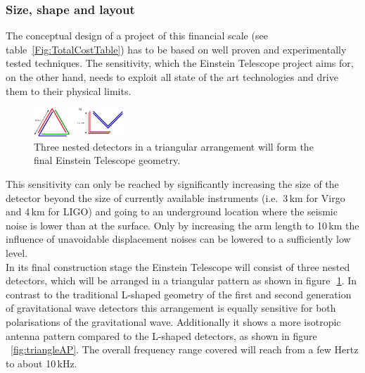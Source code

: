 \subsubsection{Size, shape and layout}
The conceptual design of a project of this financial scale (see table~\ref{Fig:TotalCostTable}) has to be based on well proven and experimentally tested techniques. The sensitivity, which the Einstein Telescope project aims for, on the other hand, needs to exploit all state of the art technologies and drive them to their physical limits. 
\begin{figure}
	\centering
		\includegraphics[width=0.3\textwidth]{Sec_Introduction/NestedDetectors.pdf}
	\caption{Three nested detectors in a triangular arrangement will form the final Einstein Telescope geometry.}
	\label{fig:NestedDetectors}
\end{figure}
This sensitivity can only be reached by significantly increasing the size of the detector beyond the size of currently available instruments (i.e.\ 3\,km for Virgo and 4\,km for LIGO) and going to an underground location where the seismic noise is lower than at the surface. Only by increasing the arm length to 10\,km the influence of unavoidable displacement noises can be lowered to a sufficiently low level.\\
In its final construction stage the Einstein Telescope will consist of three nested detectors, which will be arranged in a triangular pattern as shown in figure\,~\ref{fig:NestedDetectors}. 
In contrast to the traditional L-shaped geometry of the first and second generation of gravitational wave detectors this arrangement is equally sensitive for both polarisations of the gravitational wave. Additionally it shows a more isotropic antenna pattern compared to the L-shaped detectors, as shown in figure\,~\ref{fig:triangleAP}. The overall frequency range covered will reach from a few Hertz to about 10\,kHz.

